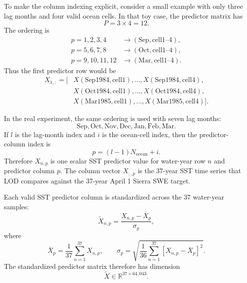 \documentclass[11pt]{article}
\begin{document}
To make the column indexing explicit, consider a small example with only three lag months and four
valid ocean cells. In that toy case, the predictor matrix has
\[
P = 3 \times 4 = 12.
\]
The ordering is
\begin{equation}
\begin{aligned}
p=1,2,3,4 &\longrightarrow (\mathrm{Sep},\mathrm{cell}1\text{--}4),\\
p=5,6,7,8 &\longrightarrow (\mathrm{Oct},\mathrm{cell}1\text{--}4),\\
p=9,10,11,12 &\longrightarrow (\mathrm{Mar},\mathrm{cell}1\text{--}4).
\end{aligned}
\label{eq:lod_flattening_example_table}
\end{equation}
Thus the first predictor row would be
\begin{equation}
\begin{aligned}
X_{1,:} = \bigl[
&X(\mathrm{Sep1984},\mathrm{cell}1),\ldots,X(\mathrm{Sep1984},\mathrm{cell}4),\\
&X(\mathrm{Oct1984},\mathrm{cell}1),\ldots,X(\mathrm{Oct1984},\mathrm{cell}4),\\
&X(\mathrm{Mar1985},\mathrm{cell}1),\ldots,X(\mathrm{Mar1985},\mathrm{cell}4)
\bigr].
\end{aligned}
\label{eq:lod_flattening_example_row}
\end{equation}

In the real experiment, the same ordering is used with seven lag months:
\[
\mathrm{Sep},\mathrm{Oct},\mathrm{Nov},\mathrm{Dec},\mathrm{Jan},\mathrm{Feb},\mathrm{Mar}.
\]
If $l$ is the lag-month index and $i$ is the ocean-cell index, then the predictor-column index is
\begin{equation}
p=(l-1)N_{\mathrm{ocean}}+i.
\label{eq:lod_flattening_column_index}
\end{equation}
Therefore $X_{n,p}$ is one scalar SST predictor value for water-year row $n$ and predictor
column $p$. The column vector $X_{:,p}$ is the 37-year SST time series that LOD compares against
the 37-year April 1 Sierra SWE target.

Each valid SST predictor column is standardized across the 37 water-year samples:
\begin{equation}
\widetilde{X}_{n,p}
=
\frac{
X_{n,p} - \overline{X}_p
}{
\sigma_p
},
\label{eq:sst_candidate_standardized}
\end{equation}
where
\begin{equation}
\overline{X}_p
=
\frac{1}{37}
\sum_{n=1}^{37}
X_{n,p},
\qquad
\sigma_p
=
\sqrt{
\frac{1}{36}
\sum_{n=1}^{37}
\left[X_{n,p}-\overline{X}_p\right]^2
}.
\label{eq:sst_candidate_mean_std}
\end{equation}
The standardized predictor matrix therefore has dimension
\begin{equation}
\widetilde{X} \in \mathbb{R}^{37 \times 64{,}043}.
\label{eq:sst_standardized_predictor_dim}
\end{equation}
\end{document}
